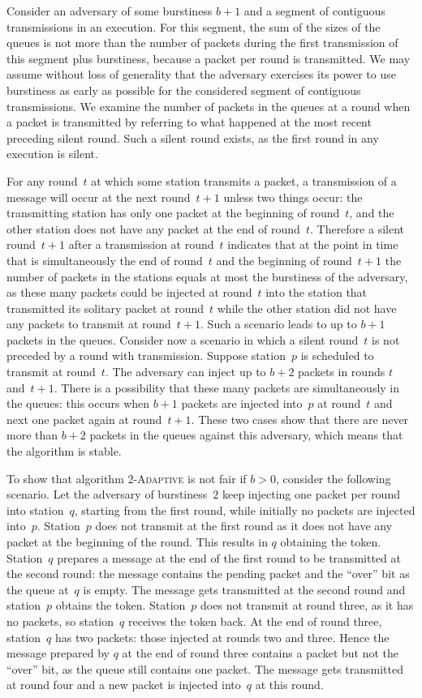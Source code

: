 \documentclass[11pt]{article}
\begin{document}
Consider an adversary of some burstiness $b+1$ and a segment of contiguous transmissions in an execution.
For this segment, the sum of the sizes of the queues is not more than the number of packets during the first transmission of this segment plus burstiness, because a packet per round is transmitted.
We may assume without loss of generality that the adversary exercises its power to use burstiness as early as possible for the considered segment of contiguous transmissions.
We examine the number of packets in the queues at a round when a packet is transmitted by referring to what happened at the most recent preceding silent round.
Such a silent round exists, as the first round in any execution is silent.

For any round~$t$ at which some station transmits a packet, a transmission of a message will occur at the next round~$t+1$ unless two things occur: the transmitting station has only one packet at the beginning of round~$t$, and the other station does not have any packet at the end of round~$t$.
Therefore a silent round~$t+1$ after a transmission at round~$t$ indicates that at the point in time that is simultaneously the end of round~$t$ and the beginning of round~$t+1$ the number of packets in the stations equals at most the burstiness of the adversary, as these many packets could be injected at round~$t$ into the station that transmitted its solitary packet at round~$t$ while the other station did not have any packets to transmit at round~$t+1$.
Such a scenario leads to up to $b+1$ packets in the queues.
Consider now a scenario in which a silent round~$t$ is not preceded by a round with transmission.
Suppose station~$p$ is scheduled to transmit at round~$t$.
The adversary can inject up to $b+2$ packets in rounds $t$ and~$t+1$.
There is a possibility that these many packets are simultaneously in the queues: this occurs when $b+1$ packets are injected into~$p$ at round~$t$ and next one packet again at round~$t+1$.
These two cases show that there are never more than $b+2$ packets in the queues against this adversary, which means that the algorithm is stable.

To show that algorithm  \textsc{2-Adaptive} is not fair if $b>0$, consider the following scenario.
Let the adversary of burstiness~$2$ keep injecting one packet per round into station~$q$, starting from the first round, while initially no packets are injected into~$p$.
Station~$p$ does not transmit at the first round as it does not have any packet at the beginning of the round.
This results in $q$ obtaining the token.
Station~$q$ prepares a message at the end of the first round to be transmitted at the second round: the message contains the pending packet and the ``over'' bit as the queue at~$q$ is empty.
The message gets transmitted at the second round and station~$p$ obtains the token.
Station~$p$ does not transmit at round three, as it has no packets, so station~$q$ receives  the token back.
At the end of round three, station~$q$ has two packets: those injected at rounds two and three.
Hence the message prepared by $q$ at the end of round three contains a packet but not the ``over'' bit, as the queue still contains one packet.
The message gets transmitted at round four and a new packet is injected into~$q$ at this round.
\end{document}
